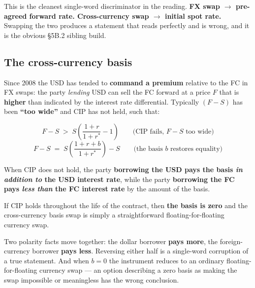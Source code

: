 \begin{lrtrapbox}
This is the cleanest single-word discriminator in the reading. \textbf{FX swap $\rightarrow$ pre-agreed forward rate. Cross-currency swap $\rightarrow$ initial spot rate.} Swapping the two produces a statement that reads perfectly and is wrong, and it is the obvious \S5B.2 sibling build.
\end{lrtrapbox}

\subsection{The cross-currency basis}

Since 2008 the USD has tended to \textbf{command a premium} relative to the FC in FX swaps: the party \emph{lending} USD can sell the FC forward at a price $F$ that is \textbf{higher} than indicated by the interest rate differential. Typically $(F - S)$ has been \textbf{``too wide''} and CIP has not held, such that:

\begin{lrfmlbox}
\[ F - S \;>\; S\left(\frac{1+r}{1+r^{*}} - 1\right) \qquad\text{(CIP fails, $F-S$ too wide)} \]
\[ F - S \;=\; S\left(\frac{1 + r + b}{1 + r^{*}}\right) - S \qquad\text{(the basis $b$ restores equality)} \]
\end{lrfmlbox}

\begin{lrkeybox}
When CIP does not hold, the party \textbf{borrowing the USD pays the basis \emph{in addition to} the USD interest rate}, while the party \textbf{borrowing the FC pays \emph{less than} the FC interest rate} by the amount of the basis.

If CIP holds throughout the life of the contract, then \textbf{the basis is zero} and the cross-currency basis swap is simply a straightforward floating-for-floating currency swap.
\end{lrkeybox}

\begin{lrtrapbox}
Two polarity facts move together: the dollar borrower \textbf{pays more}, the foreign-currency borrower \textbf{pays less}. Reversing either half is a single-word corruption of a true statement. And when $b = 0$ the instrument reduces to an ordinary floating-for-floating currency swap --- an option describing a zero basis as making the swap impossible or meaningless has the wrong conclusion.
\end{lrtrapbox}

